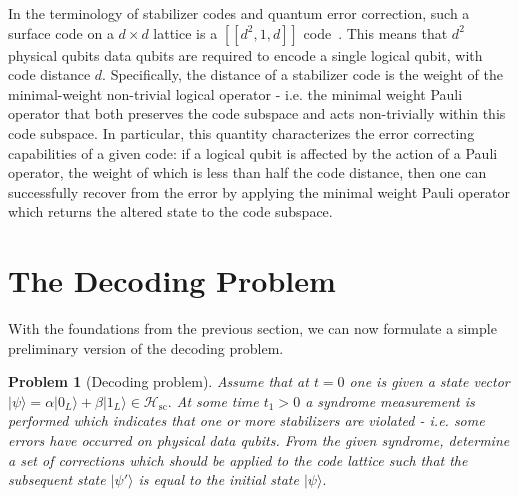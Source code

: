 \documentclass[twocolumn,preprintnumbers,amsmath,amssymb,notitlepage,nofootinbib,longbibliography,superscriptaddress,aps,pra,10pt]{revtex4-1}
\newtheorem{problem}{Problem}%
\begin{document}
	In the terminology of stabilizer codes and quantum error correction,  such a surface code on a $d\times d$ lattice is a 
	$[[d^2,1,d]]$ code~\cite{Gottesman97}.
	This means that $d^2$ physical qubits data qubits are required to encode a single logical qubit, with code distance $d$.
	Specifically, the distance of a stabilizer code is the weight of the minimal-weight non-trivial logical operator - i.e. the minimal weight Pauli operator that both preserves the code subspace and acts non-trivially within this code subspace.
	In particular, this quantity characterizes the error correcting capabilities of a given code: if a logical qubit is affected by the action of a Pauli operator, the weight of which is less than half the code distance, then one can successfully recover from the error by applying the minimal weight Pauli operator which returns the altered state to the code subspace.

\section{The Decoding Problem}\label{s:the_decoding_problem}

	With the foundations from the previous section, we can now formulate a simple preliminary version of the decoding problem.

	\begin{problem}[Decoding problem]Assume that at $t=0$ one is given a state vector $|\psi\rangle = \alpha |0_L\rangle + \beta |1_L\rangle \in \mathcal{H}_{\mathrm{sc}}.$ \textit{At some time }$t_1>0$ \textit{a syndrome measurement is performed which indicates that one or more stabilizers are violated - i.e. some errors have occurred on physical data qubits.
	From the given syndrome, determine a set of corrections which should be applied to the code lattice such that the subsequent state} $|\psi'\rangle$ \textit{is equal to the initial state} $|\psi\rangle.$ 
	\end{problem}
	
\end{document}
